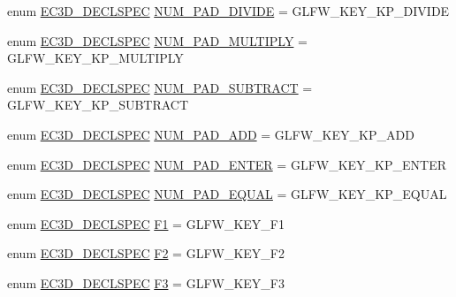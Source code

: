 \begin{DoxyCompactItemize}
\item 
enum \mbox{\hyperlink{_common_8h_aac42573e202ca3dd4d259c81691e2369}{E\+C3\+D\+\_\+\+D\+E\+C\+L\+S\+P\+EC}} \mbox{\hyperlink{classec_1_1_keyboard_ad33a07123f5f838806b1e85d8f936dde}{N\+U\+M\+\_\+\+P\+A\+D\+\_\+\+D\+I\+V\+I\+DE}} = G\+L\+F\+W\+\_\+\+K\+E\+Y\+\_\+\+K\+P\+\_\+\+D\+I\+V\+I\+DE
\item 
enum \mbox{\hyperlink{_common_8h_aac42573e202ca3dd4d259c81691e2369}{E\+C3\+D\+\_\+\+D\+E\+C\+L\+S\+P\+EC}} \mbox{\hyperlink{classec_1_1_keyboard_a18cafa779cedf999cfd00db2f11c2e48}{N\+U\+M\+\_\+\+P\+A\+D\+\_\+\+M\+U\+L\+T\+I\+P\+LY}} = G\+L\+F\+W\+\_\+\+K\+E\+Y\+\_\+\+K\+P\+\_\+\+M\+U\+L\+T\+I\+P\+LY
\item 
enum \mbox{\hyperlink{_common_8h_aac42573e202ca3dd4d259c81691e2369}{E\+C3\+D\+\_\+\+D\+E\+C\+L\+S\+P\+EC}} \mbox{\hyperlink{classec_1_1_keyboard_ace6b24f7c2333966a87683a193784794}{N\+U\+M\+\_\+\+P\+A\+D\+\_\+\+S\+U\+B\+T\+R\+A\+CT}} = G\+L\+F\+W\+\_\+\+K\+E\+Y\+\_\+\+K\+P\+\_\+\+S\+U\+B\+T\+R\+A\+CT
\item 
enum \mbox{\hyperlink{_common_8h_aac42573e202ca3dd4d259c81691e2369}{E\+C3\+D\+\_\+\+D\+E\+C\+L\+S\+P\+EC}} \mbox{\hyperlink{classec_1_1_keyboard_acf60ce5226595db3f854bff555c451c7}{N\+U\+M\+\_\+\+P\+A\+D\+\_\+\+A\+DD}} = G\+L\+F\+W\+\_\+\+K\+E\+Y\+\_\+\+K\+P\+\_\+\+A\+DD
\item 
enum \mbox{\hyperlink{_common_8h_aac42573e202ca3dd4d259c81691e2369}{E\+C3\+D\+\_\+\+D\+E\+C\+L\+S\+P\+EC}} \mbox{\hyperlink{classec_1_1_keyboard_a7f4971d0bfdf533496432cf270025d83}{N\+U\+M\+\_\+\+P\+A\+D\+\_\+\+E\+N\+T\+ER}} = G\+L\+F\+W\+\_\+\+K\+E\+Y\+\_\+\+K\+P\+\_\+\+E\+N\+T\+ER
\item 
enum \mbox{\hyperlink{_common_8h_aac42573e202ca3dd4d259c81691e2369}{E\+C3\+D\+\_\+\+D\+E\+C\+L\+S\+P\+EC}} \mbox{\hyperlink{classec_1_1_keyboard_ab804765f16421c386f1d7c7e0a0e66fb}{N\+U\+M\+\_\+\+P\+A\+D\+\_\+\+E\+Q\+U\+AL}} = G\+L\+F\+W\+\_\+\+K\+E\+Y\+\_\+\+K\+P\+\_\+\+E\+Q\+U\+AL
\item 
enum \mbox{\hyperlink{_common_8h_aac42573e202ca3dd4d259c81691e2369}{E\+C3\+D\+\_\+\+D\+E\+C\+L\+S\+P\+EC}} \mbox{\hyperlink{classec_1_1_keyboard_aa5d09923e2ac2f5dd3b2a5b33a06b721}{F1}} = G\+L\+F\+W\+\_\+\+K\+E\+Y\+\_\+\+F1
\item 
enum \mbox{\hyperlink{_common_8h_aac42573e202ca3dd4d259c81691e2369}{E\+C3\+D\+\_\+\+D\+E\+C\+L\+S\+P\+EC}} \mbox{\hyperlink{classec_1_1_keyboard_a039646ad1000430fd7bcdf04b2c91ec7}{F2}} = G\+L\+F\+W\+\_\+\+K\+E\+Y\+\_\+\+F2
\item 
enum \mbox{\hyperlink{_common_8h_aac42573e202ca3dd4d259c81691e2369}{E\+C3\+D\+\_\+\+D\+E\+C\+L\+S\+P\+EC}} \mbox{\hyperlink{classec_1_1_keyboard_a3002ddc8f37c24a1429e22d5dc8e48aa}{F3}} = G\+L\+F\+W\+\_\+\+K\+E\+Y\+\_\+\+F3

\end{DoxyCompactItemize}
